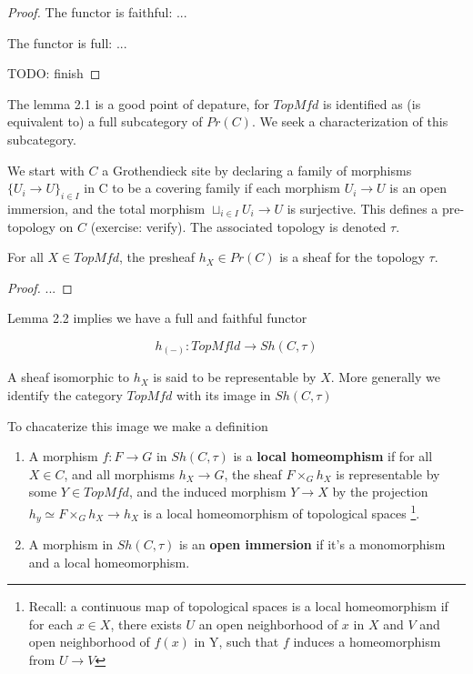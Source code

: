 \documentclass[../main.tex]{subfiles}
\begin{document}
\begin{proof}
The functor is faithful: ...

The functor is full: ...

TODO: finish
\end{proof}

The lemma 2.1 is a good point of depature, for $TopMfd$ is identified as (is equivalent to) a full subcategory of $Pr(C)$. We seek a characterization of this subcategory.

We start with $C$ a Grothendieck site by declaring a family of morphisms $\{U_i \to U\}_{i \in I}$ in C to be a covering family if each morphism $U_i \to U$ is an open immersion, and the total morphism $\sqcup_{i \in I} U_i \to U$ is surjective. This defines a pre-topology on $C$ (exercise: verify). The associated topology is denoted $\tau$.

\begin{lem}
    For all $X \in TopMfd$, the presheaf $h_X \in Pr(C)$ is a sheaf for the topology $\tau$.
\end{lem}

\begin{proof}
    ...
\end{proof}

Lemma 2.2 implies we have a full and faithful functor

\[
h_{(-)}: TopMfld \to Sh(C, \tau)
\]

A sheaf isomorphic to $h_X$ is said to be representable by $X$. More generally we identify the category $TopMfd$ with its image in $Sh(C, \tau)$

To chacaterize this image we make a definition

\begin{defn}
    \begin{enumerate}
            \item A morphism $f: F \to G$ in $Sh(C, \tau)$ is a \textbf{local homeomphism} if for all $X \in C$, and all morphisms $h_X \to G$, the sheaf $F \times_G h_X$ is representable by some $Y \in TopMfd$, and the induced morphism $Y \to X$ by the projection $h_y \simeq F \times_G h_X \to h_X$ is a local homeomorphism of topological spaces \footnote{Recall: a continuous map of topological spaces is a local homeomorphism if for each $x \in X$, there exists $U$ an open neighborhood of $x$ in $X$ and $V$ and open neighborhood of $f(x)$ in Y, such that $f$ induces a homeomorphism from $U \to V$}.

            \item A morphism in $Sh(C, \tau)$ is an \textbf{open immersion} if it's a monomorphism and a local homeomorphism.
    \end{enumerate}
\end{defn}
\end{document}
